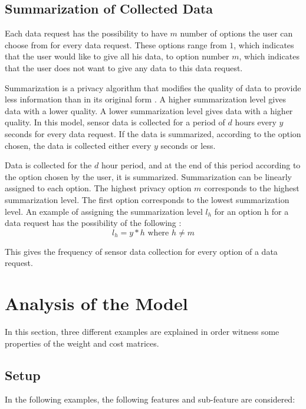 \subsection{Summarization of Collected Data} \label{summa}
Each data request has the possibility to have $m$ number of options the user can choose from for every data request. These options range from $1$, which indicates that the user would like to give all his data, to option number $m$, which indicates that the user does not want to give any data to this data request.

Summarization is a privacy algorithm that modifies the quality of data to provide less information than in its original form \cite{pournaras2016self}. A higher summarization level gives data with a lower quality. A lower summarization level gives data with a higher quality. In this model, sensor data is collected for a period of $d$ hours every $y$ seconds for every data request. If the data is summarized, according to the option chosen, the data is collected either every $y$ seconds or less.

Data is collected for the $d$ hour period, and at the end of this period according to the option chosen by the user, it is summarized. Summarization can
be linearly assigned to each option.
The highest privacy option $m$ corresponds to the highest summarization level. The first option corresponds to the lowest summarization level. An example of assigning the summarization level $l_{h}$ for an option h for a data request has the possibility of the following :
\begin{equation}
l_{h} = y*h \text{ where } h \neq m
\end{equation}

This gives the frequency of sensor data collection for every option of a data request.

\section{Analysis of the Model} \label{analysis_model}
In this section, three different examples are explained in order witness some properties of the weight and cost matrices.

\subsection{Setup}
In the following examples, the following features and sub-feature are considered:

